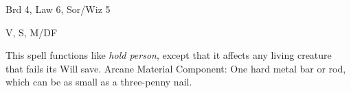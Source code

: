 
\begin{description*}
\item[Level:] Brd 4, Law 6, Sor/Wiz 5
\item[Components:] V, S, M/DF
\end{description*}

This spell functions like \textit{hold person}, except that it affects any living
creature that fails its Will save.
Arcane Material Component: One hard metal bar or rod, which can be as
small as a three-penny nail.